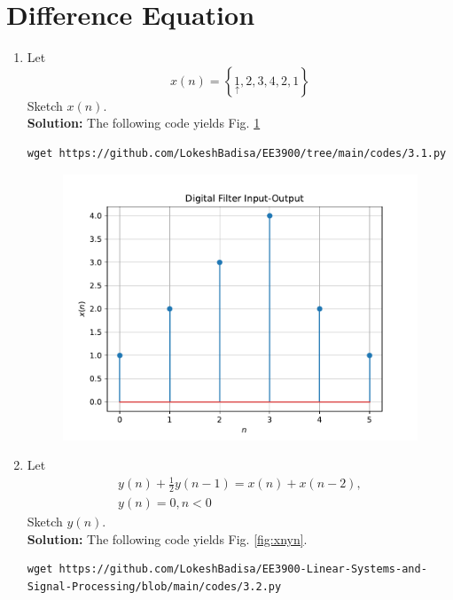 \documentclass[journal,12pt,twocolumn]{IEEEtran}
\newcommand{\solution}{\noindent \textbf{Solution: }}
\providecommand{\cbrak}[1]{\ensuremath{\left\{#1\right\}}}
\numberwithin{equation}{section}
\renewcommand\thesection{\arabic{section}}
\begin{document}
\section{Difference Equation}
\begin{enumerate}[label=\thesection.\arabic*,ref=\thesection.\theenumi]
\item Let
\begin{equation}
x(n) = \cbrak{\underset{\uparrow}{1},2,3,4,2,1}
\end{equation}
Sketch $x(n)$.
\\
\solution The following code yields Fig. \ref{fig:3.1}
\begin{lstlisting}
wget https://github.com/LokeshBadisa/EE3900/tree/main/codes/3.1.py
\end{lstlisting}
\begin{figure}[!ht]
\begin{center}
\includegraphics[width=\columnwidth]{./figs/3.1}
\end{center}
\label{fig:3.1}	
\end{figure}
\item Let
\begin{multline}
\label{eq:iir_filter}
y(n) + \frac{1}{2}y(n-1) = x(n) + x(n-2), 
\\
 y(n) = 0, n < 0
\end{multline}
Sketch $y(n)$.
\\
\solution The following code yields Fig. \ref{fig:xnyn}.
\begin{lstlisting}
wget https://github.com/LokeshBadisa/EE3900-Linear-Systems-and-Signal-Processing/blob/main/codes/3.2.py

\end{lstlisting}
\end{enumerate}
\end{document}
